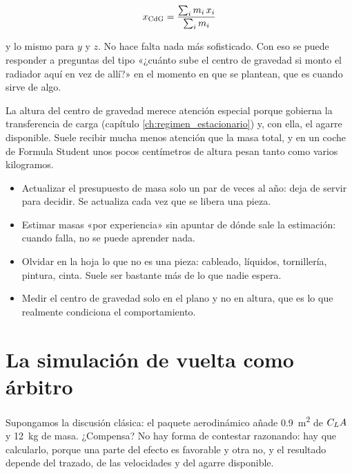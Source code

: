 \begin{equation}
  x_{\mathrm{CdG}} = \frac{\sum_i m_i\, x_i}{\sum_i m_i}
  \label{eq:cdg}
\end{equation}

y lo mismo para $y$ y $z$. No hace falta nada más sofisticado. Con eso se puede
responder a preguntas del tipo «¿cuánto sube el centro de gravedad si monto el
radiador aquí en vez de allí?» en el momento en que se plantean, que es cuando
sirve de algo.

La altura del centro de gravedad merece atención especial porque gobierna la
transferencia de carga (capítulo \ref{ch:regimen_estacionario}) y, con ella, el
agarre disponible. Suele recibir mucha menos atención que la masa total, y en un
coche de Formula Student unos pocos centímetros de altura pesan tanto como varios
kilogramos.

\begin{ojo}
\begin{itemize}
  \item Actualizar el presupuesto de masa solo un par de veces al año: deja de
        servir para decidir. Se actualiza cada vez que se libera una pieza.
  \item Estimar masas «por experiencia» sin apuntar de dónde sale la estimación:
        cuando falla, no se puede aprender nada.
  \item Olvidar en la hoja lo que no es una pieza: cableado, líquidos, tornillería,
        pintura, cinta. Suele ser bastante más de lo que nadie espera.
  \item Medir el centro de gravedad solo en el plano y no en altura, que es lo
        que realmente condiciona el comportamiento.
\end{itemize}
\end{ojo}

\section{La simulación de vuelta como árbitro}
\label{sec:coche_como_sistema:04}

Supongamos la discusión clásica: el paquete aerodinámico añade
\SI{0.9}{\meter\squared} de $C_L A$ y \SI{12}{\kilogram} de masa. ¿Compensa? No
hay forma de contestar razonando: hay que calcularlo, porque una parte del efecto
es favorable y otra no, y el resultado depende del trazado, de las velocidades y
del agarre disponible.

